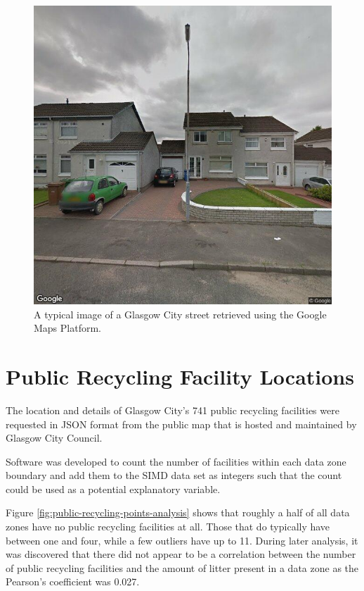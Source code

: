 \documentclass{thesis}
\begin{document}
\begin{figure}[h]
    \centering
    \includegraphics[scale=0.4]{images/street-view-image.jpg}
    \caption{A typical image of a Glasgow City street retrieved using the Google Maps Platform.}
    \label{fig:street-view-image}
\end{figure}

\section{Public Recycling Facility Locations}

The location and details of Glasgow City's 741 public recycling facilities were requested in JSON format from the public map that is hosted and maintained by Glasgow City Council.

Software was developed to count the number of facilities within each data zone boundary and add them to the SIMD data set as integers such that the count could be used as a potential explanatory variable.

Figure \ref{fig:public-recycling-points-analysis} shows that roughly a half of all data zones have no public recycling facilities at all. Those that do typically have between one and four, while a few outliers have up to 11. During later analysis, it was discovered that there did not appear to be a correlation between the number of public recycling facilities and the amount of litter present in a data zone as the Pearson's coefficient was 0.027.
\end{document}
